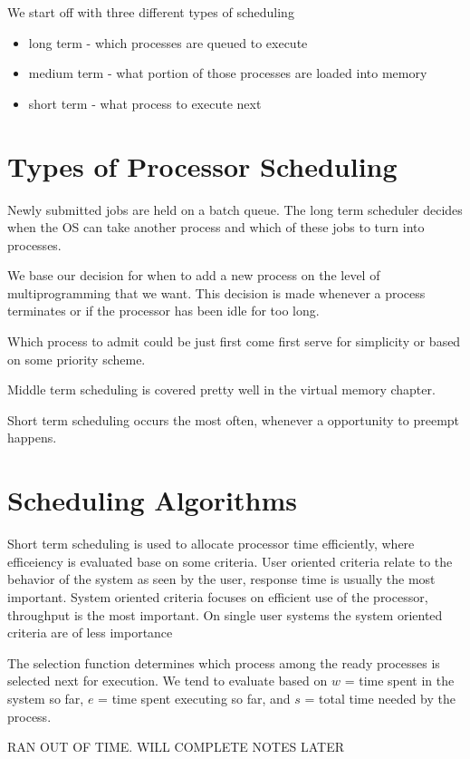\documentclass[12pt]{article}
\begin{document}

We start off with three different types of scheduling
\begin{itemize}
  \item long term - which processes are queued to execute
  \item medium term - what portion of those processes are loaded into memory
  \item short term - what process to execute next
\end{itemize}
\section*{Types of Processor Scheduling}
Newly submitted jobs are held on a batch queue. The long term scheduler decides when the OS can take another process and which of these jobs to turn into processes.

We base our decision for when to add a new process on the level of multiprogramming that we want. This decision is made whenever a process terminates or if the processor has been idle for too long.

Which process to admit could be just first come first serve for simplicity or based on some priority scheme.

Middle term scheduling is covered pretty well in the virtual memory chapter.

Short term scheduling occurs the most often, whenever a opportunity to preempt happens.

\section*{Scheduling Algorithms}
Short term scheduling is used to allocate processor time efficiently, where efficeiency is evaluated base on some criteria. User oriented criteria relate to the behavior of the system as seen by the user, response time is usually the most important. System oriented criteria focuses on efficient use of the processor, throughput is the most important. On single user systems the system oriented criteria are of less importance

The selection function determines which process among the ready processes is selected next for execution. We tend to evaluate based on $w$ = time spent in the system so far, $e$ = time spent executing so far, and $s$ = total time needed by the process.


RAN OUT OF TIME. WILL COMPLETE NOTES LATER
\end{document}
